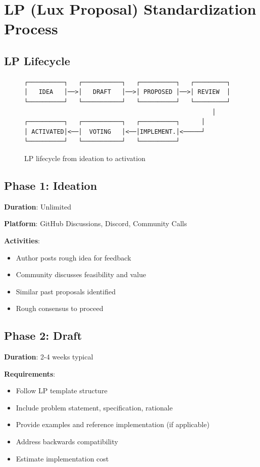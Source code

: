 \documentclass[11pt,a4paper]{article}
\begin{document}
\section{LP (Lux Proposal) Standardization Process}

\subsection{LP Lifecycle}

\begin{figure}[h]
\centering
\begin{verbatim}
┌──────────┐   ┌───────────┐   ┌──────────┐   ┌─────────┐
│   IDEA   │──>│   DRAFT   │──>│ PROPOSED │──>│ REVIEW  │
└──────────┘   └───────────┘   └──────────┘   └─────────┘
                                                    │
┌──────────┐   ┌───────────┐   ┌──────────┐      │
│ ACTIVATED│<──│  VOTING   │<──│IMPLEMENT.│<─────┘
└──────────┘   └───────────┘   └──────────┘
\end{verbatim}
\caption{LP lifecycle from ideation to activation}
\end{figure}

\subsection{Phase 1: Ideation}

\textbf{Duration}: Unlimited

\textbf{Platform}: GitHub Discussions, Discord, Community Calls

\textbf{Activities}:
\begin{itemize}
\item Author posts rough idea for feedback
\item Community discusses feasibility and value
\item Similar past proposals identified
\item Rough consensus to proceed
\end{itemize}

\subsection{Phase 2: Draft}

\textbf{Duration}: 2-4 weeks typical

\textbf{Requirements}:
\begin{itemize}
\item Follow LP template structure
\item Include problem statement, specification, rationale
\item Provide examples and reference implementation (if applicable)
\item Address backwards compatibility
\item Estimate implementation cost
\end{itemize}
\end{document}
